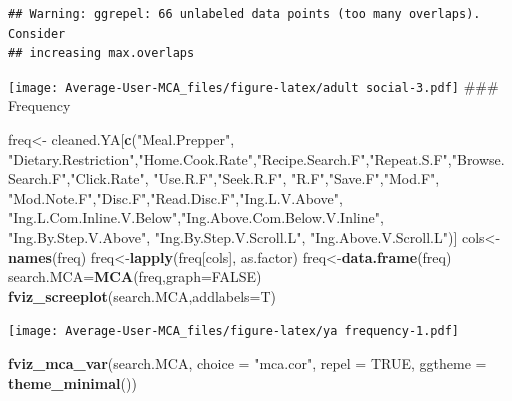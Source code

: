 \documentclass[
]{article}
\newenvironment{Shaded}{\begin{snugshade}}{\end{snugshade}}
\newcommand{\DataTypeTok}[1]{\textcolor[rgb]{0.13,0.29,0.53}{#1}}
\newcommand{\KeywordTok}[1]{\textcolor[rgb]{0.13,0.29,0.53}{\textbf{#1}}}
\newcommand{\NormalTok}[1]{#1}
\newcommand{\OtherTok}[1]{\textcolor[rgb]{0.56,0.35,0.01}{#1}}
\newcommand{\StringTok}[1]{\textcolor[rgb]{0.31,0.60,0.02}{#1}}
\begin{document}
\begin{verbatim}
## Warning: ggrepel: 66 unlabeled data points (too many overlaps). Consider
## increasing max.overlaps
\end{verbatim}

\texttt{[image: Average-User-MCA\_files/figure-latex/adult social-3.pdf]}
\#\#\# Frequency

\begin{Shaded}
\begin{Highlighting}[]
\NormalTok{freq<-}\StringTok{ }\NormalTok{cleaned.YA[}\KeywordTok{c}\NormalTok{(}\StringTok{"Meal.Prepper"}\NormalTok{, }\StringTok{"Dietary.Restriction"}\NormalTok{,}\StringTok{"Home.Cook.Rate"}\NormalTok{,}\StringTok{"Recipe.Search.F"}\NormalTok{,}\StringTok{"Repeat.S.F"}\NormalTok{,}\StringTok{"Browse.Search.F"}\NormalTok{,}\StringTok{"Click.Rate"}\NormalTok{,}
            \StringTok{"Use.R.F"}\NormalTok{,}\StringTok{"Seek.R.F"}\NormalTok{, }\StringTok{"R.F"}\NormalTok{,}\StringTok{"Save.F"}\NormalTok{,}\StringTok{"Mod.F"}\NormalTok{, }\StringTok{"Mod.Note.F"}\NormalTok{,}\StringTok{"Disc.F"}\NormalTok{,}\StringTok{"Read.Disc.F"}\NormalTok{,}\StringTok{"Ing.L.V.Above"}\NormalTok{,}
            \StringTok{"Ing.L.Com.Inline.V.Below"}\NormalTok{,}\StringTok{"Ing.Above.Com.Below.V.Inline"}\NormalTok{,  }\StringTok{"Ing.By.Step.V.Above"}\NormalTok{,  }\StringTok{"Ing.By.Step.V.Scroll.L"}\NormalTok{,}
            \StringTok{"Ing.Above.V.Scroll.L"}\NormalTok{)]}
\NormalTok{cols<-}\KeywordTok{names}\NormalTok{(freq)}
\NormalTok{freq<-}\KeywordTok{lapply}\NormalTok{(freq[cols], as.factor)}
\NormalTok{freq<-}\KeywordTok{data.frame}\NormalTok{(freq)}
\NormalTok{search.MCA=}\KeywordTok{MCA}\NormalTok{(freq,}\DataTypeTok{graph=}\OtherTok{FALSE}\NormalTok{)}
\KeywordTok{fviz_screeplot}\NormalTok{(search.MCA,}\DataTypeTok{addlabels=}\NormalTok{T)}
\end{Highlighting}
\end{Shaded}

\texttt{[image: Average-User-MCA\_files/figure-latex/ya frequency-1.pdf]}

\begin{Shaded}
\begin{Highlighting}[]
\KeywordTok{fviz_mca_var}\NormalTok{(search.MCA, }\DataTypeTok{choice =} \StringTok{"mca.cor"}\NormalTok{, }\DataTypeTok{repel =} \OtherTok{TRUE}\NormalTok{,}
             \DataTypeTok{ggtheme =} \KeywordTok{theme_minimal}\NormalTok{())}
\end{Highlighting}
\end{Shaded}
\end{document}
